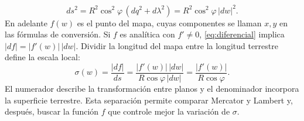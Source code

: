 \begin{equation}
 ds^2=R^2\cos^2\varphi\,(dq^2+d\lambda^2)
 =R^2\cos^2\varphi\,|dw|^2.
 \label{eq:metrica_conforme}
\end{equation}
En adelante $f(w)$ es el punto del mapa, cuyas componentes se llaman $x,y$ en las fórmulas de conversión. Si $f$ es analítica con $f'\ne0$, \eqref{eq:diferencial} implica $|df|=|f'(w)|\,|dw|$. Dividir la longitud del mapa entre la longitud terrestre define la escala local:
\begin{equation}
 \sigma(w)=\frac{|df|}{ds}
 =\frac{|f'(w)|\,|dw|}{R\cos\varphi\,|dw|}
 =\frac{|f'(w)|}{R\cos\varphi}.
 \label{eq:sigma}
\end{equation}
El numerador describe la transformación entre planos y el denominador incorpora la superficie terrestre. Esta separación permite comparar Mercator y Lambert y, después, buscar la función $f$ que controle mejor la variación de $\sigma$.
